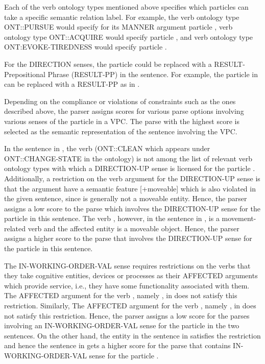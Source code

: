 \documentclass[output=paper,modfonts,nonflat]{langsci/langscibook}
\begin{document}
Each of the verb ontology types mentioned above specifies which particles can take a specific semantic relation label. For example, the verb ontology type ONT::PURSUE would specify for its MANNER argument particle , verb ontology type ONT::ACQUIRE would specify particle , and verb ontology type ONT:EVOKE-TIREDNESS would specify particle .  

For the DIRECTION senses, the particle could be replaced with a RESULT-Pre\-po\-si\-tional Phrase (RESULT-PP) in the sentence. For example, the particle  in  can be replaced with a RESULT-PP  as in .

Depending on the compliance or violations of constraints such as the ones described above, the parser assigns scores for various parse options involving various senses of the particle in a VPC. The parse with the highest score is selected as the semantic representation of the sentence involving the VPC.

In the sentence  in , the verb  (ONT::CLEAN which appears under ONT::CHANGE-STATE in the ontology) is not among the list of relevant verb ontology types with which a DIRECTION-UP sense is licensed for the particle . Additionally, a restriction on the verb argument for the DIRECTION-UP sense is that the argument have a semantic feature [+moveable] which is also violated in the given sentence, since  is generally not a moveable entity. Hence, the parser assigns a low score to the parse which involves the DIRECTION-UP sense for the particle  in this sentence. The verb , however, in the sentence in , is a movement-related verb and the affected entity  is a moveable object. Hence, the parser assigns a higher score to the parse that involves the DIRECTION-UP sense for the particle  in this sentence.

The IN-WORKING-ORDER-VAL sense requires restrictions on the verbs that they take cognitive entities, devices or processes as their AFFECTED arguments which provide service, i.e., they have some functionality associated with them. The AFFECTED argument for the verb , namely , in  does not satisfy this restriction. Similarly, The AFFECTED argument for the verb , namely , in  does not satisfy this restriction. Hence, the parser assigns a low score for the parses involving an IN-WORKING-ORDER-VAL sense for the particle  in the two sentences. On the other hand, the entity  in the sentence in  satisfies the restriction and hence the sentence in  gets a higher score for the parse that contains IN-WORKING-ORDER-VAL sense for the particle . 
\end{document}
